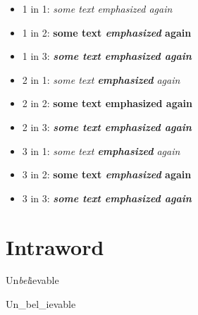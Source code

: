 \begin{itemize}
\item 1 in 1: \emph{some text \emph{emphasized} again}

\item 1 in 2: \textbf{some text \emph{emphasized} again}

\item 1 in 3: \textbf{\emph{some text \emph{emphasized} again}}

\item 2 in 1: \emph{some text \textbf{emphasized} again}

\item 2 in 2: \textbf{some text \textbf{emphasized} again}

\item 2 in 3: \textbf{\emph{some text \textbf{emphasized} again}}

\item 3 in 1: \emph{some text \textbf{\emph{emphasized}} again}

\item 3 in 2: \textbf{some text \textbf{\emph{emphasized}} again}

\item 3 in 3: \textbf{\emph{some text \textbf{\emph{emphasized}} again}}

\end{itemize}

\chapter{Intraword}
\label{intraword}

Un\emph{bel}ievable

Un\_bel\_ievable




